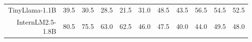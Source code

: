 \begin{table}[t]
{\begin{tabular}{rccccc|ccccc}
TinyLlama-1.1B & \cellcolor[HTML]{FBE5CC}39.5 & \cellcolor[HTML]{F8D9CC}30.5 & \cellcolor[HTML]{F7D7CC}28.5 & \cellcolor[HTML]{F5CECC}21.5 & \cellcolor[HTML]{F8DACC}31.0 & \cellcolor[HTML]{EBEED0}48.5 & \cellcolor[HTML]{F4F0CE}43.5 & \cellcolor[HTML]{DDEBD2}56.5 & \cellcolor[HTML]{E0ECD2}54.5 & \cellcolor[HTML]{E4ECD1}52.5 \\
InternLM2.5-1.8B & \cellcolor[HTML]{DAEAD3}80.5 & \cellcolor[HTML]{E0ECD2}75.5 & \cellcolor[HTML]{F0EFCF}63.0 & \cellcolor[HTML]{F0EFCF}62.5 & \cellcolor[HTML]{FDECCC}46.0 & \cellcolor[HTML]{EDEECF}47.5 & \cellcolor[HTML]{FAF1CD}40.0 & \cellcolor[HTML]{F3F0CE}44.0 & \cellcolor[HTML]{E9EDD0}49.5 & \cellcolor[HTML]{ECEED0}48.0 \\
\bottomrule
\end{tabular}%
}
\end{table}

